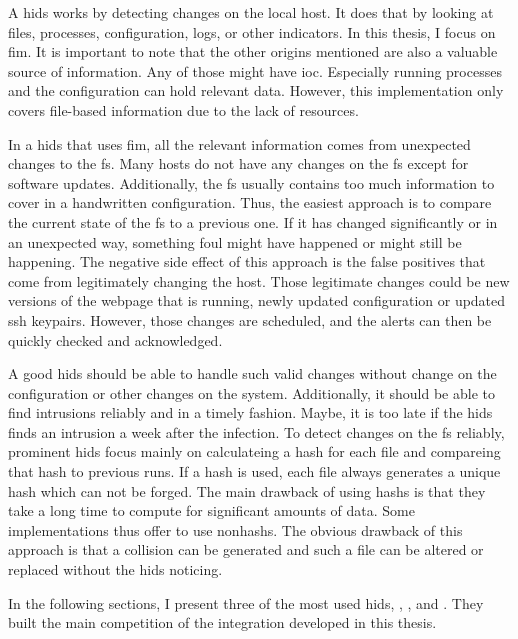A \gls{hids} works by detecting changes on the local host. It does that by looking at files, processes, configuration, logs, or other indicators. In this thesis, I focus on \gls{fim}. It is important to note that the other origins mentioned are also a valuable source of information. Any of those might have \gls{ioc}. Especially running processes and the configuration can hold relevant data. However, this implementation only covers file-based information due to the lack of resources.


In a \gls{hids} that uses \gls{fim}, all the relevant information comes from unexpected changes to the \gls{fs}. Many hosts do not have any changes on the \gls{fs} except for software updates. Additionally, the \gls{fs} usually contains too much information to cover in a handwritten configuration. Thus, the easiest approach is to compare the current state of the \gls{fs} to a previous one. If it has changed significantly or in an unexpected way, something foul might have happened or might still be happening. The negative side effect of this approach is the false positives that come from legitimately changing the host. Those legitimate changes could be new versions of the webpage that is running, newly updated configuration or updated ssh keypairs. However, those changes are scheduled, and the alerts can then be quickly checked and acknowledged.

A good \gls{hids} should be able to handle such valid changes without change on the configuration or other changes on the system. Additionally, it should be able to find intrusions reliably and in a timely fashion. Maybe, it is too late if the \gls{hids} finds an intrusion a week after the infection. To detect changes on the \gls{fs} reliably, prominent \gls{hids} focus mainly on calculateing a hash for each file and compareing that hash to previous runs. If a \gls{hash} is used, each file always generates a unique hash which can not be forged. The main drawback of using \glspl{hash} is that they take a long time to compute for significant amounts of data. Some implementations thus offer to use \glspl{nonhash}. The obvious drawback of this approach is that a \gls{collision} can be generated and such a file can be altered or replaced without the \gls{hids} noticing.

In the following sections, I present three of the most used \gls{hids}, , , and . They built the main competition of the integration developed in this thesis.

